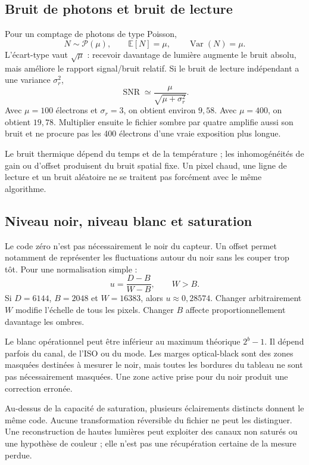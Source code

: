 \subsection{Bruit de photons et bruit de lecture}
Pour un comptage de photons de type Poisson,
\begin{equation}
N\sim\mathcal P(\mu),\qquad \mathbb E[N]=\mu,
\qquad \operatorname{Var}(N)=\mu.
\end{equation}
L'écart-type vaut $\sqrt\mu$ : recevoir davantage de lumière augmente
le bruit absolu, mais améliore le rapport signal/bruit relatif.
Si le bruit de lecture indépendant a une variance $\sigma_r^2$,
\begin{equation}
\operatorname{SNR}\simeq\frac{\mu}{\sqrt{\mu+\sigma_r^2}}.
\end{equation}
Avec $\mu=100$ électrons et $\sigma_r=3$, on obtient environ $9{,}58$.
Avec $\mu=400$, on obtient $19{,}78$. Multiplier ensuite le fichier
sombre par quatre amplifie aussi son bruit et ne procure pas les
400 électrons d'une vraie exposition plus longue.

Le bruit thermique dépend du temps et de la température ; les
inhomogénéités de gain ou d'offset produisent du bruit spatial fixe.
Un pixel chaud, une ligne de lecture et un bruit aléatoire ne se
traitent pas forcément avec le même algorithme.

\subsection{Niveau noir, niveau blanc et saturation}
Le code zéro n'est pas nécessairement le noir du capteur. Un offset
permet notamment de représenter les fluctuations autour du noir
sans les couper trop tôt. Pour une normalisation simple :
\begin{equation}\label{eq:normalisation}
u=\frac{D-B}{W-B},\qquad W>B.
\end{equation}
Si $D=6144$, $B=2048$ et $W=16383$, alors $u\approx0{,}28574$.
Changer arbitrairement $W$ modifie l'échelle de tous les pixels.
Changer $B$ affecte proportionnellement davantage les ombres.

Le blanc opérationnel peut être inférieur au maximum théorique
$2^b-1$. Il dépend parfois du canal, de l'ISO ou du mode. Les marges
optical-black sont des zones masquées destinées à mesurer le noir,
mais toutes les bordures du tableau ne sont pas nécessairement masquées.
Une zone active prise pour du noir produit une correction erronée.

Au-dessus de la capacité de saturation, plusieurs éclairements
distincts donnent le même code. Aucune transformation réversible
du fichier ne peut les distinguer. Une reconstruction de hautes
lumières peut exploiter des canaux non saturés ou une hypothèse de
couleur ; elle n'est pas une récupération certaine de la mesure perdue.

